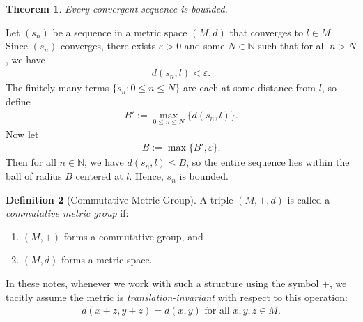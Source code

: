 \documentclass{amsart}
\numberwithin{equation}{section}
\let\oldendproof\endproof
\renewenvironment{proof}[1][\proofname]{%
  \setcounter{case}{0}
  \setcounter{step}{0}
  \oldproof[#1]%
}{\oldendproof}
\theoremstyle{plain}
\newtheorem{theorem}{Theorem}[section]
\theoremstyle{definition}
\newtheorem{definition}[theorem]{Definition}
\theoremstyle{remark}
\begin{document}
\begin{theorem}\label{Thm:ConvergentImpliesBounded}
  Every convergent sequence is bounded.
\end{theorem}
\begin{proof}
  Let $(s_n)$ be a sequence in a metric space $(M, d)$ that converges to $l\in M$. Since $(s_n)$ converges, there exists $\varepsilon > 0$ and some $N \in \mathbb{N}$ such that for all $n > N$, we have
  \begin{align*}
    d(s_n, l) < \varepsilon.
  \end{align*}
  The finitely many terms $\{s_n : 0 \leq n \leq N\}$ are each at some distance from $l$, so define
  \begin{align*}
    B' := \max_{0 \leq n \leq N} \{ d(s_n, l) \}.
  \end{align*}
  Now let
  \begin{align*}
    B := \max \{B', \varepsilon\}.
  \end{align*}
  Then for all $n\in\mathbb{N}$, we have $d(s_n, l) \leq B$, so the entire sequence lies within the ball of radius $B$ centered at $l$. Hence, $s_n$ is bounded.
\end{proof}

\begin{definition}[Commutative Metric Group]
  A triple $(M, +, d)$ is called a \emph{commutative metric group} if:
  \begin{enumerate}
    \item $(M, +)$ forms a commutative group, and
    \item $(M, d)$ forms a metric space.
  \end{enumerate}
  In these notes, whenever we work with such a structure using the symbol $+$, we tacitly assume the metric is \emph{translation-invariant} with respect to this operation:
  \begin{align*}
    d(x + z, y + z) = d(x, y)\text{ for all }x, y, z \in M.
  \end{align*}
\end{definition}
\end{document}

